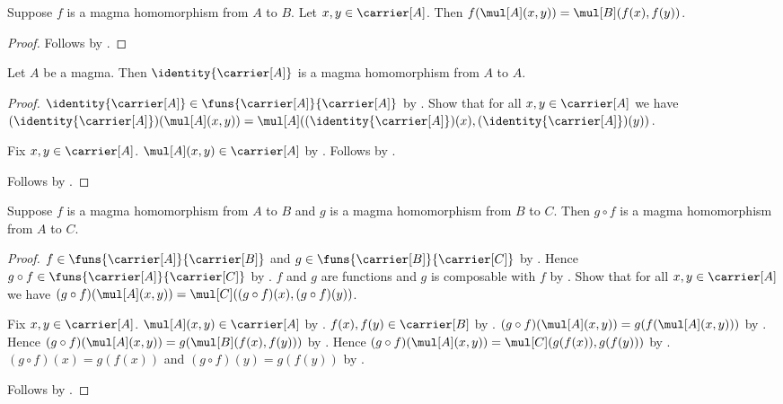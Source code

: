 \begin{proposition}\label{magma_hom_mul}
    Suppose $f$ is a magma homomorphism from $A$ to $B$.
    Let $x,y\in\carrier[A]$.
    Then $f(\mul[A](x,y))=\mul[B](f(x),f(y))$.
\end{proposition}
\begin{proof}
    Follows by .
\end{proof}

\begin{proposition}\label{identity_magma_hom}
    Let $A$ be a magma.
    Then $\identity{\carrier[A]}$ is a magma homomorphism from $A$ to $A$.
\end{proposition}
\begin{proof}
    $\identity{\carrier[A]}\in
        \funs{\carrier[A]}{\carrier[A]}$ by
        .
    Show that for all $x,y\in\carrier[A]$ we have
        $(\identity{\carrier[A]})(\mul[A](x,y))=
            \mul[A]((\identity{\carrier[A]})(x),
                (\identity{\carrier[A]})(y))$.
    \begin{subproof}
        Fix $x,y\in\carrier[A]$.
        $\mul[A](x,y)\in\carrier[A]$ by .
        Follows by .
    \end{subproof}
    Follows by .
\end{proof}

\begin{theorem}\label{magma_hom_composition}
    Suppose $f$ is a magma homomorphism from $A$ to $B$ and
        $g$ is a magma homomorphism from $B$ to $C$.
    Then $g\circ f$ is a magma homomorphism from $A$ to $C$.
\end{theorem}
\begin{proof}
    $f\in\funs{\carrier[A]}{\carrier[B]}$ and
        $g\in\funs{\carrier[B]}{\carrier[C]}$ by
        .
    Hence $g\circ f\in\funs{\carrier[A]}{\carrier[C]}$ by
        .
    $f$ and $g$ are functions and $g$ is composable with $f$ by
        .
    Show that for all $x,y\in\carrier[A]$ we have
        $(g\circ f)(\mul[A](x,y))=
            \mul[C]((g\circ f)(x),(g\circ f)(y))$.
    \begin{subproof}
        Fix $x,y\in\carrier[A]$.
        $\mul[A](x,y)\in\carrier[A]$ by .
        $f(x),f(y)\in\carrier[B]$ by
            .
        $(g\circ f)(\mul[A](x,y))=g(f(\mul[A](x,y)))$ by
            .
        Hence
            $(g\circ f)(\mul[A](x,y))=
                g(\mul[B](f(x),f(y)))$ by
            .
        Hence
            $(g\circ f)(\mul[A](x,y))=
                \mul[C](g(f(x)),g(f(y)))$ by
            .
        $(g\circ f)(x)=g(f(x))$ and
            $(g\circ f)(y)=g(f(y))$ by .
    \end{subproof}
    Follows by .
\end{proof}

